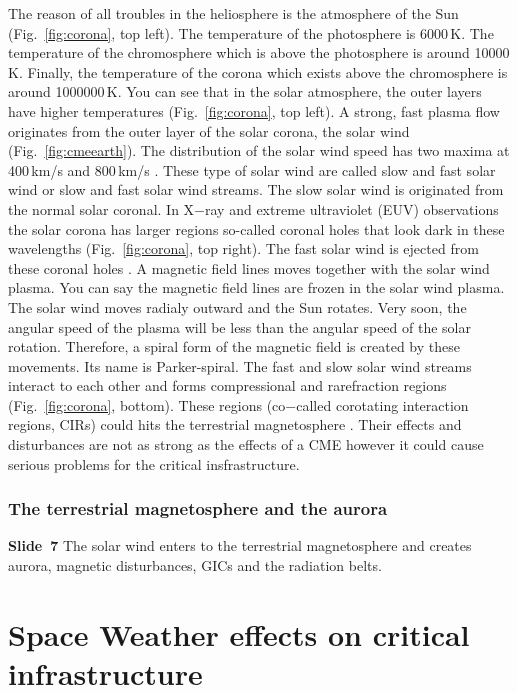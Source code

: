 \documentclass[sn-aps]{sn-jnl}%
\begin{document}
The reason of all troubles in the heliosphere is the atmosphere of the Sun (Fig.~\ref{fig:corona}, top left). The temperature of the photosphere is 6000\,K. The temperature of the chromosphere which is above the photosphere is around 10000\,K. Finally, the temperature of the corona which exists above the chromosphere is around 1000000\,K. You can see that in the solar atmosphere, the outer layers have higher temperatures (Fig.~\ref{fig:corona}, top left). A strong, fast plasma flow originates from the outer layer of the solar corona, the solar wind (Fig.~\ref{fig:cmeearth}). The distribution of the solar wind speed has two maxima at 400\,km/s and 800\,km/s \cite{mccomas98:_ulyss}. These type of solar wind are called slow and fast solar wind or slow and fast solar wind streams. The slow solar wind is originated from the normal solar coronal. In X$-$ray and extreme ultraviolet (EUV) observations the solar corona has larger regions so-called coronal holes that look dark in these wavelengths (Fig.~\ref{fig:corona}, top right). The fast solar wind is ejected from these coronal holes \cite{scherer05:_space_weath,stix04:_sun_introd}. A magnetic field lines moves together with the solar wind plasma. You can say the magnetic field lines are frozen in the solar wind plasma. The solar wind moves radialy outward and the Sun rotates. Very soon, the angular speed of the plasma will be less than the angular speed of the solar rotation. Therefore, a spiral form of the magnetic field is created by these movements. Its name is Parker-spiral. The fast and slow solar wind streams interact to each other and forms compressional and rarefraction regions (Fig.~\ref{fig:corona}, bottom). These regions (co$-$called corotating interaction regions, CIRs) could hits the terrestrial magnetosphere \cite{scherer05:_space_weath}. Their effects and disturbances are not as strong as the effects of a CME however it could cause serious problems for the critical insfrastructure. 

\subsubsection{The terrestrial magnetosphere and the aurora}
\label{sec:magn}

\textbf{Slide~7} The solar wind enters to the terrestrial magnetosphere and creates aurora, magnetic disturbances, GICs and the radiation belts.

\section{Space Weather effects on critical infrastructure}
\label{sec:sweci}
\end{document}
